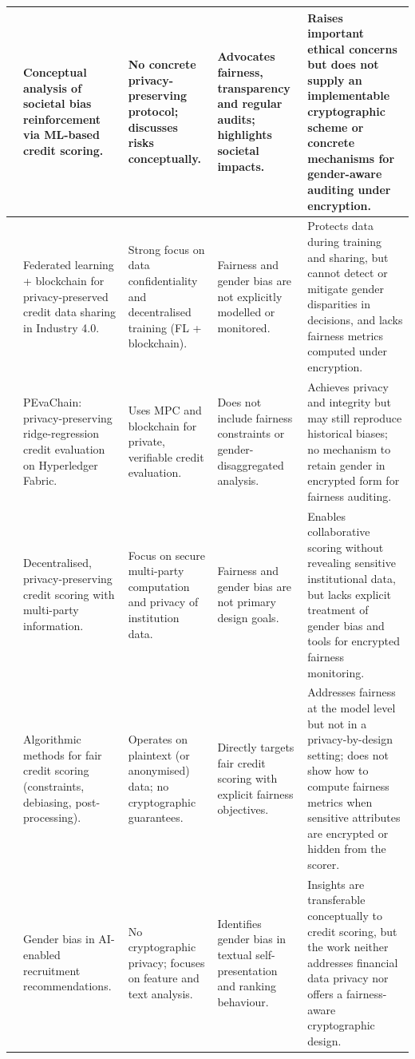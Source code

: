 \documentclass[a4paper,fleqn]{cas-dc}
\begin{document}
\begin{table}[htbp]
\begin{tabular}{|p{1.2cm}|p{2.8cm}|p{2.8cm}|p{2.8cm}|p{4.0cm}|}
\cite{hassani2021societal}
& Conceptual analysis of societal bias reinforcement via ML-based credit scoring. 
& No concrete privacy-preserving protocol; discusses risks conceptually. 
& Advocates fairness, transparency and regular audits; highlights societal impacts. 
& Raises important ethical concerns but does not supply an implementable cryptographic scheme or concrete mechanisms for gender-aware auditing under encryption. \\
\hline

\cite{Yang2022privacy}
& Federated learning + blockchain for privacy-preserved credit data sharing in Industry 4.0. 
& Strong focus on data confidentiality and decentralised training (FL + blockchain). 
& Fairness and gender bias are not explicitly modelled or monitored. 
& Protects data during training and sharing, but cannot detect or mitigate gender disparities in decisions, and lacks fairness metrics computed under encryption. \\
\hline

\cite{qiao2023pevachain}
& PEvaChain: privacy-preserving ridge-regression credit evaluation on Hyperledger Fabric. 
& Uses MPC and blockchain for private, verifiable credit evaluation. 
& Does not include fairness constraints or gender-disaggregated analysis. 
& Achieves privacy and integrity but may still reproduce historical biases; no mechanism to retain gender in encrypted form for fairness auditing. \\
\hline

\cite{he2023privacy}
& Decentralised, privacy-preserving credit scoring with multi-party information. 
& Focus on secure multi-party computation and privacy of institution data. 
& Fairness and gender bias are not primary design goals. 
& Enables collaborative scoring without revealing sensitive institutional data, but lacks explicit treatment of gender bias and tools for encrypted fairness monitoring. \\
\hline

\cite{moldovan2023algorithmic}
& Algorithmic methods for fair credit scoring (constraints, debiasing, post-processing). 
& Operates on plaintext (or anonymised) data; no cryptographic guarantees. 
& Directly targets fair credit scoring with explicit fairness objectives. 
& Addresses fairness at the model level but not in a privacy-by-design setting; does not show how to compute fairness metrics when sensitive attributes are encrypted or hidden from the scorer. \\
\hline

\cite{simon2023utilizing}
& Gender bias in AI-enabled recruitment recommendations. 
& No cryptographic privacy; focuses on feature and text analysis. 
& Identifies gender bias in textual self-presentation and ranking behaviour. 
& Insights are transferable conceptually to credit scoring, but the work neither addresses financial data privacy nor offers a fairness-aware cryptographic design. \\
\hline


\end{tabular}
\end{table}
\end{document}
